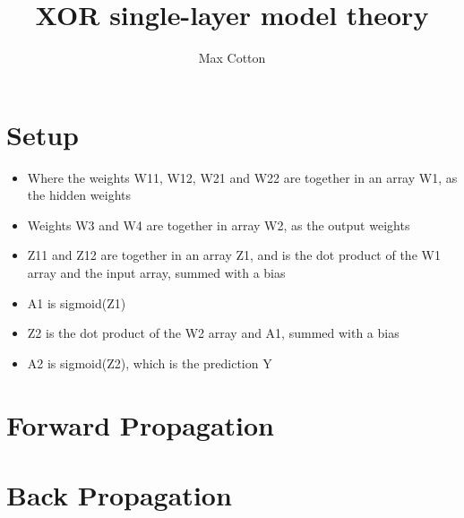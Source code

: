 \documentclass[10pt,a4paper]{article}
\title{XOR single-layer model theory}
\author{Max Cotton}
\date{}
\begin{document}
\maketitle

\section{Setup}

\begin{itemize}
    \item Where the weights W11, W12, W21 and W22 are together in an array W1, as the hidden weights
    \item Weights W3 and W4 are together in array W2, as the output weights
    \item Z11 and Z12 are together in an array Z1, and is the dot product of the W1 array and the input array, summed with a bias 
    \item A1 is sigmoid(Z1)
    \item Z2 is the dot product of the W2 array and A1, summed with a bias
    \item A2 is sigmoid(Z2), which is the prediction Y
\end{itemize}

\section{Forward Propagation}

\section{Back Propagation}
\end{document}
